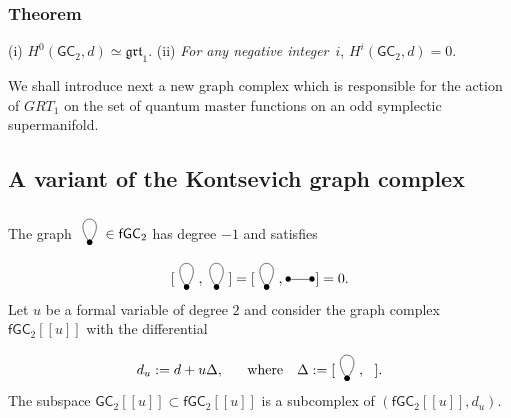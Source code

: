 \documentclass{amsart}
\theoremstyle{plain}
\theoremstyle{definition}
\begin{document}
\subsubsection{\bf Theorem \cite{Wi}} \label{thm:negzero} (i) $
H^0({{\mathsf G}}{{\mathsf C}}_2, d)\simeq {{\mathfrak{{grt}}}_1}.$ (ii)  {\em For any negative integer}\, $i$, $H^i({{\mathsf G}}{{\mathsf C}}_2, d)=0$.
 

{\smallskip}

We shall introduce  next a new graph complex which is responsible for the action of ${GRT_1}$ on the set of quantum master functions on an odd symplectic supermanifold.

\subsection{A variant of the Kontsevich graph complex} The graph
$
\xy
(0,-2)*{\bullet}="A";
(0,-2)*{\bullet}="B";
"A"; "B" **\crv{(6,6) & (-6,6)};
\endxy
 \in {{\mathsf f}}{{\mathsf G}}{{\mathsf C}}_2
$
has degree $-1$ and satisfies
$$
[\xy
(0,-2)*{\bullet}="A";
(0,-2)*{\bullet}="B";
"A"; "B" **\crv{(6,6) & (-6,6)};
\endxy  ,   \xy
(0,-2)*{\bullet}="A";
(0,-2)*{\bullet}="B";
"A"; "B" **\crv{(6,6) & (-6,6)};
\endxy  ]=[\xy
(0,-2)*{\bullet}="A";
(0,-2)*{\bullet}="B";
"A"; "B" **\crv{(6,6) & (-6,6)};
\endxy , \xy
 (0,0)*{\bullet}="a",
(6,0)*{\bullet}="b",
\ar @{-} "a";"b" <0pt>
\endxy]=0.
$$
Let $u$  be a formal variable of degree $2$ and consider the graph complex ${{\mathsf f}}{{\mathsf G}}{{\mathsf C}}_2[[u]]$ with the differential
$$
d_u:= d+ u \Delta,\ \ \ \ \ \mbox{where}\ \ \ \Delta:=[\xy
(0,-2)*{\bullet}="A";
(0,-2)*{\bullet}="B";
"A"; "B" **\crv{(6,6) & (-6,6)};
\endxy  , \ \ ].
$$
The subspace ${{\mathsf G}}{{\mathsf C}}_2[[u]]\subset {{\mathsf f}}{{\mathsf G}}{{\mathsf C}}_2[[u]]$ is a subcomplex of $({{\mathsf f}}{{\mathsf G}}{{\mathsf C}}_2[[u]], d_u)$.
\end{document}
